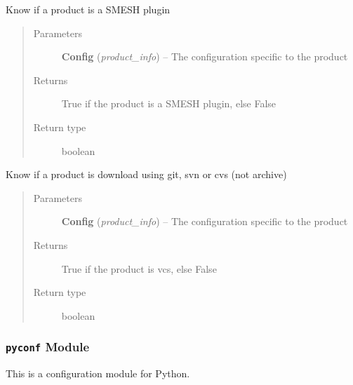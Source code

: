 \documentclass[a4paper,10pt,english]{sphinxmanual}
\begin{document}
\begin{fulllineitems}
\label{commands/apidoc/src:src.product.product_is_smesh_plugin}
Know if a product is a SMESH plugin
\begin{quote}\begin{description}
\item[{Parameters}] \leavevmode
\textbf{Config} (\emph{product\_info}) -- The configuration specific to 
the product

\item[{Returns}] \leavevmode
True if the product is a SMESH plugin, else False

\item[{Return type}] \leavevmode
boolean

\end{description}\end{quote}

\end{fulllineitems}


\begin{fulllineitems}
\label{commands/apidoc/src:src.product.product_is_vcs}
Know if a product is download using git, svn or cvs (not archive)
\begin{quote}\begin{description}
\item[{Parameters}] \leavevmode
\textbf{Config} (\emph{product\_info}) -- The configuration specific to 
the product

\item[{Returns}] \leavevmode
True if the product is vcs, else False

\item[{Return type}] \leavevmode
boolean

\end{description}\end{quote}

\end{fulllineitems}



\subsubsection{\texttt{pyconf} Module}
\label{commands/apidoc/src:pyconf-module}\label{commands/apidoc/src:module-src.pyconf}
This is a configuration module for Python.
\end{document}
